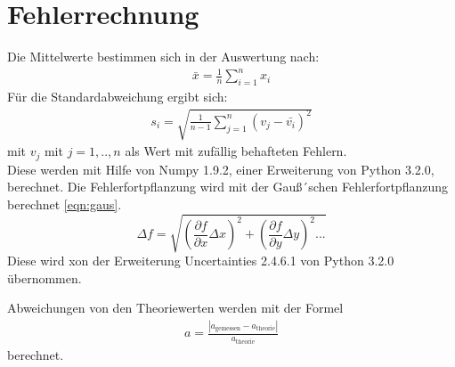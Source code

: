 \section{Fehlerrechnung}
Die Mittelwerte bestimmen sich in der Auswertung nach:
\begin{align}
  \bar{x}=\frac{1}{n} \sum_{i=1}^n x_i
\end{align}
Für die Standardabweichung ergibt sich:
\begin{align}
 s_i=\sqrt{\frac{1}{n-1}\sum_{j=1}^n (v_j-\bar{v_i})^2}
\end{align}
mit $v_j$ mit $j=1,..,n$ als Wert mit zufällig behafteten Fehlern.\\
Diese werden mit Hilfe von
Numpy 1.9.2, einer Erweiterung von Python 3.2.0, berechnet.
Die Fehlerfortpflanzung wird mit der Gauß´schen Fehlerfortpflanzung berechnet
 \eqref{eqn:gaus}.
\begin{equation}
\Delta f= \sqrt{\left(\frac{\partial f}{\partial x}\Delta x \right)^{2} + \left( \frac{\partial f}{\partial y}\Delta y\right)^2...}\label{eqn:gaus}
\end{equation}
Diese wird xon der Erweiterung Uncertainties 2.4.6.1 von Python 3.2.0 übernommen.

Abweichungen von den Theoriewerten werden mit der Formel
\begin{align}
  a=\frac{|a_\mathrm{gemessen}-a_\mathrm{theorie}|}{a_\mathrm{theorie}} \label{eqn:abweich}
\end{align}
berechnet.
\newpage
